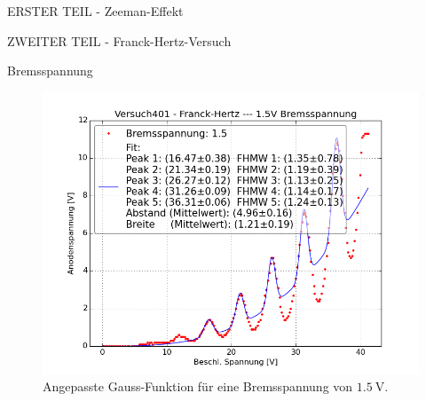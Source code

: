 \begin{appendix}
\begin{chapter}{ERSTER TEIL - Zeeman-Effekt}
  \end{chapter}
  
  
  
  \begin{chapter}{ZWEITER TEIL - Franck-Hertz-Versuch}
    \label{Anhang:chp:FH}
    
    
    
    \begin{section}{Bremsspannung}
      \label{Anhang:chp:FHbremsspannung}
      \begin{figure}[htbp!]
        \centering
        \begin{minipage}{0.48\textwidth}
          \centering
          \includegraphics[width=\textwidth]
              {Figures/Versuch401-Franck-Hertz-1_5VBremsspannung_Beschl_Spannung_Anodenspannung.png}
          \caption{Angepasste Gauss-Funktion für eine Bremsspannung von 
              $\SI{1.5}{\volt}$.}
          \label{fig:AnhangFHB15V}
        \end{minipage} \quad
        \begin{minipage}{0.48\textwidth}
          \centering

\end{minipage}
\end{figure}
\end{section}
\end{chapter}
\end{appendix}
